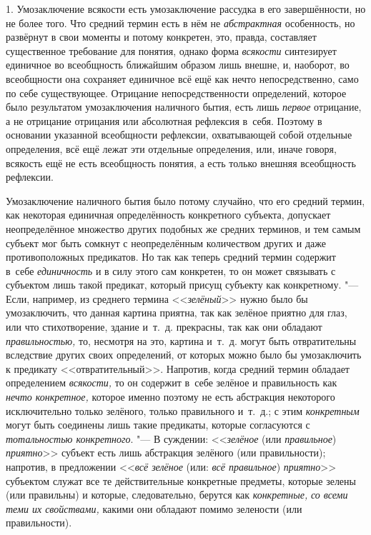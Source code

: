 1. Умозаключение всякости есть умозаключение рассудка в его
завершённости, но не более того. Что средний термин есть в нём не
{\em абстрактная}
особенность, но развёрнут в свои моменты и потому конкретен,
это, правда, составляет существенное требование для понятия, однако форма
{\em всякости}
синтезирует единичное во всеобщность ближайшим образом лишь
внешне, и, наоборот, во всеобщности она сохраняет единичное всё ещё как
нечто непосредственно, само по себе существующее. Отрицание
непосредственности определений, которое было результатом умозаключения
наличного бытия, есть лишь {\em первое}
отрицание, а не отрицание отрицания или абсолютная рефлексия
в~себя. Поэтому в основании указанной всеобщности рефлексии, охватывающей
собой отдельные определения, всё ещё лежат эти отдельные определения, или,
иначе говоря, всякость ещё не есть всеобщность понятия, а есть только
внешняя всеобщность рефлексии.

Умозаключение наличного бытия было потому случайно, что его
средний термин, как некоторая единичная определённость конкретного
субъекта, допускает неопределённое множество других подобных же средних
терминов, и тем самым субъект мог быть сомкнут с неопределённым количеством
других и даже противоположных предикатов. Но так как теперь средний термин
содержит в~себе {\em единичность}
и в силу этого сам конкретен, то он может связывать с
субъектом лишь такой предикат, который присущ субъекту как конкретному. "---
Если, например, из среднего термина
<<{\em зелёный}>> нужно
было бы умозаключить, что данная картина приятна, так как зелёное приятно
для глаз, или что стихотворение, здание и~т.~д. прекрасны, так как они
обладают {\em правильностью,}
то, несмотря на это, картина и~т.~д. могут быть отвратительны
вследствие других своих определений, от которых можно было бы умозаключить
к предикату <<отвратительный>>. Напротив, когда средний термин обладает
определением {\em всякости,}
то он содержит в~себе зелёное и правильность как
{\em нечто конкретное,}
которое именно поэтому не есть абстракция некоторого
исключительно только зелёного, только правильного и~т.~д.; с этим
{\em конкретным} могут
быть соединены лишь такие предикаты, которые согласуются с
{\em тотальностью конкретного}. "---
В суждении:
<<{\em зелёное} (или
{\em правильное})
{\em приятно}>> субъект
есть лишь абстракция зелёного (или правильности); напротив, в предложении
<<{\em всё зелёное} (или:
{\em всё правильное})
{\em приятно}>> субъектом
служат все те действительные конкретные предметы, которые зелены (или
правильны) и которые, следовательно, берутся как
{\em конкретные,}
{\em со всеми теми их свойствами,}
какими они обладают помимо зелености (или правильности).

